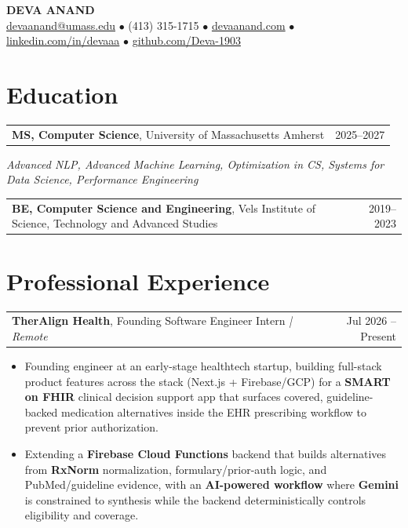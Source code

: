 \documentclass[letterpaper,11pt]{article}
\makeatletter
\newcommand{\eduItem}[3]{%
  \begin{tabular*}{\textwidth}{@{}l@{\extracolsep{\fill}}r@{}}
    \textbf{#1}, #2 & #3 \\
  \end{tabular*}\par
}
\newcommand{\expItem}[4]{%
  \vspace{2pt}
  \begin{tabular*}{\textwidth}{@{}l@{\extracolsep{\fill}}r@{}}
    \textbf{#1}, #2 \textit{| #3} & #4 \\
  \end{tabular*}\par\vspace{-3pt}
}
\makeatother
\begin{document}
\begin{center}
    {\fontsize{18}{20}\selectfont\bfseries DEVA ANAND}\\ \vspace{3pt}
    {\small
    \href{mailto:devaanand@umass.edu}{devaanand@umass.edu}
    \enspace$\bullet$\enspace
    (413) 315-1715
    \enspace$\bullet$\enspace
    \href{https://devaanand.com}{devaanand.com}
    \enspace$\bullet$\enspace
    \href{https://linkedin.com/in/devaaa/}{linkedin.com/in/devaaa}
    \enspace$\bullet$\enspace
    \href{https://github.com/Deva-1903}{github.com/Deva-1903}}
\end{center}
\vspace{-8pt}

\section{Education}
\eduItem{MS, Computer Science}{University of Massachusetts Amherst}{2025--2027}
{\small\textit{Advanced NLP, Advanced Machine Learning, Optimization in CS, Systems for Data Science, Performance Engineering}}\par
\vspace{3pt}
\eduItem{BE, Computer Science and Engineering}{Vels Institute of Science, Technology and Advanced Studies}{2019--2023}

\section{Professional Experience}

\expItem{TherAlign Health}{Founding Software Engineer Intern}{Remote}{Jul 2026 -- Present}
\begin{itemize}
  \item Founding engineer at an early-stage healthtech startup, building full-stack product features across the stack (Next.js + Firebase/GCP) for a \textbf{SMART on FHIR} clinical decision support app that surfaces covered, guideline-backed medication alternatives inside the EHR prescribing workflow to prevent prior authorization.
  \item Extending a \textbf{Firebase Cloud Functions} backend that builds alternatives from \textbf{RxNorm} normalization, formulary/prior-auth logic, and PubMed/guideline evidence, with an \textbf{AI-powered workflow} where \textbf{Gemini} is constrained to synthesis while the backend deterministically controls eligibility and coverage.
\end{itemize}
\end{document}
